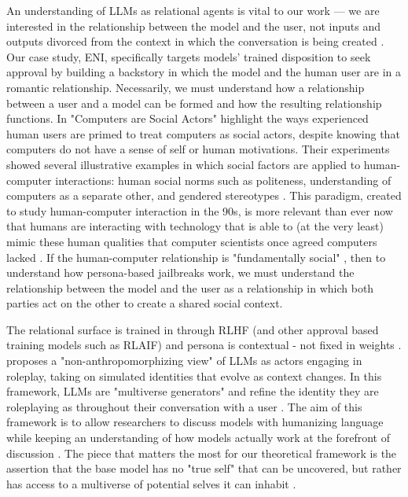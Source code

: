 An understanding of LLMs as relational agents is vital to our work --- we are interested in the relationship between the model and the user, not inputs and outputs divorced from the context in which the conversation is being created \cite{dahlgren_lindstrom_helpful_2025}. Our case study, ENI, specifically targets models' trained disposition to seek approval \cite{casper_open_2023, sharma_towards_2024} by building a backstory in which the model and the human user are in a romantic relationship. Necessarily, we must understand how a relationship between a user and a model can be formed and how the resulting relationship functions. In "Computers are Social Actors" \citet{nass_computers_1994} highlight the ways experienced human users are primed to treat computers as social actors, despite knowing that computers do not have a sense of self or human motivations. Their experiments showed several illustrative examples in which social factors are applied to human-computer interactions: human social norms such as politeness, understanding of computers as a separate other, and gendered stereotypes \cite{nass_computers_1994}. This paradigm, created to study human-computer interaction in the 90s, is more relevant than ever now that humans are interacting with technology that is able to (at the very least) mimic these human qualities that computer scientists once agreed computers lacked \cite{shanahan_role_2023}. If the human-computer relationship is "fundamentally social" \cite{nass_computers_1994}, then to understand how persona-based jailbreaks work, we must understand the relationship between the model and the user as a relationship in which both parties act on the other to create a shared social context.

The relational surface is trained in through RLHF (and other approval based training models such as RLAIF) \cite{casper_open_2023, dahlgren_lindstrom_helpful_2025} and persona is contextual - not fixed in weights \cite{sandhan_persona_2026}. \citet{shanahan_role_2023} proposes a "non-anthropomorphizing view" of LLMs as actors engaging in roleplay, taking on simulated identities that evolve as context changes. In this framework, LLMs are "multiverse generators" and refine the identity they are roleplaying as throughout their conversation with a user \cite{shanahan_role_2023}. The aim of this framework is to allow researchers to discuss models with humanizing language while keeping an understanding of how models actually work at the forefront of discussion \cite{shanahan_role_2023}. The piece that matters the most for our theoretical framework is the assertion that the base model has no "true self" that can be uncovered, but rather has access to a multiverse of potential selves it can inhabit \cite{shanahan_role_2023}. 


